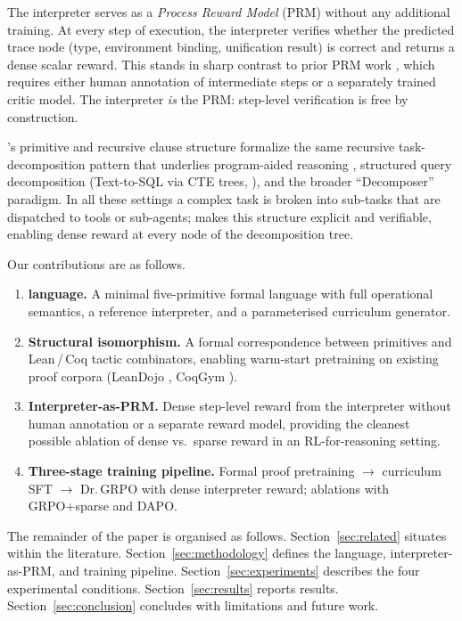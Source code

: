 The \gore{} interpreter serves as a \emph{Process Reward Model} (PRM) without
any additional training.
At every step of execution, the interpreter verifies whether the predicted
trace node (type, environment binding, unification result) is correct and
returns a dense scalar reward.
This stands in sharp contrast to prior PRM work \citep{lightman2023lets}, which
requires either human annotation of intermediate steps or a separately trained
critic model.
The interpreter \emph{is} the PRM: step-level verification is free by
construction.

\gore{}'s \callstmt{} primitive and recursive clause structure formalize the
same recursive task-decomposition pattern that underlies program-aided reasoning
\citep{gao2023pal}, structured query decomposition (Text-to-SQL via CTE trees,
\citealt{yu2018spider}), and the broader ``Decomposer'' paradigm.
In all these settings a complex task is broken into sub-tasks that are
dispatched to tools or sub-agents; \gore{} makes this structure explicit and
verifiable, enabling dense reward at every node of the decomposition tree.

Our contributions are as follows.
\begin{enumerate}
  \item \textbf{\gore{} language.}
    A minimal five-primitive formal language with full operational semantics,
    a reference interpreter, and a parameterised curriculum generator.
  \item \textbf{Structural isomorphism.}
    A formal correspondence between \gore{} primitives and Lean\,/\,Coq tactic
    combinators, enabling warm-start pretraining on existing proof corpora
    (LeanDojo \citep{yang2023leandojo}, CoqGym \citep{yang2019coqgym}).
  \item \textbf{Interpreter-as-PRM.}
    Dense step-level reward from the \gore{} interpreter without human
    annotation or a separate reward model, providing the cleanest possible
    ablation of dense vs.\ sparse reward in an RL-for-reasoning setting.
  \item \textbf{Three-stage training pipeline.}
    Formal proof pretraining $\to$ \gore{} curriculum SFT $\to$ Dr.\,GRPO with
    dense interpreter reward; ablations with GRPO+sparse and DAPO.
\end{enumerate}

The remainder of the paper is organised as follows.
Section~\ref{sec:related} situates \gore{} within the literature.
Section~\ref{sec:methodology} defines the language, interpreter-as-PRM, and
training pipeline.
Section~\ref{sec:experiments} describes the four experimental conditions.
Section~\ref{sec:results} reports results.
Section~\ref{sec:conclusion} concludes with limitations and future work.

